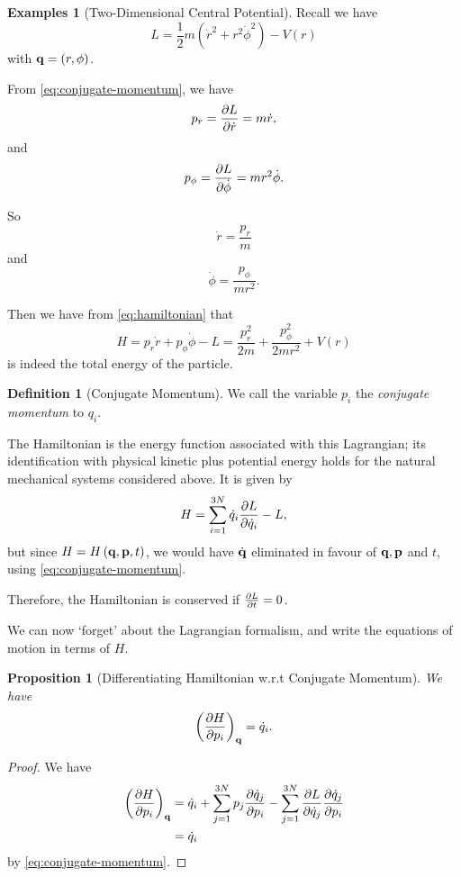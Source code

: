 \documentclass[11pt]{article}
\numberwithin{equation}{section}
\newtheorem{proposition}[theorem]{Proposition}
\theoremstyle{definition}
\newtheorem{definition}[theorem]{Definition}
\newtheorem{examples}[theorem]{Examples}
\theoremstyle{remark}
\newcommand{\pqty}[1]{\left(#1\right)}
\begin{document}
\begin{examples}[Two-Dimensional Central Potential]\label{variation-unit-0066}
    Recall we have
    \[
        L = \frac{1}{2} m \pqty{\dot{r}^2 + r^2 \dot{\phi}^2} - V\pqty{r}
    \]
    with \(\vb{q} = \pqty{r, \phi}\).

    From \autoref{eq:conjugate-momentum}, we have
    \[
        p_r = \pdv{L}{\dot{r}} = m \dot{r},
    \]
    and
    \[
        p_{\phi} = \pdv{L}{\dot{\phi}} = m r^2 \dot{\phi}.
    \]

    So
    \[
        \dot{r} = \frac{p_r}{m}
    \]
    and
    \[
        \dot{\phi} = \frac{p_\phi}{m r^2}.
    \]

    Then we have from \autoref{eq:hamiltonian} that
    \[
        H = p_r \dot{r} + p_\phi \dot{\phi} - L = \frac{p_r^2}{2m} + \frac{p_\phi^2}{2 m r^2} + V\pqty{r}
    \]
    is indeed the total energy of the particle.
\end{examples}

\begin{definition}[Conjugate Momentum]\label{variation-unit-0067}
    We call the variable \(p_i\) the \emph{conjugate momentum} to \(q_i\).
\end{definition}

The Hamiltonian is the energy function associated with this Lagrangian; its identification with physical kinetic plus potential energy holds for the natural mechanical systems considered above. It is given by
\[
    H = \sum_{i = 1}^{3N} \dot{q}_i \pdv{L}{\dot{q}_i} - L,
\]
but since \(H = H\pqty{\vb{q}, \vb{p}, t}\), we would have \(\dot{\vb{q}}\) eliminated in favour of \(\vb{q}, \vb{p}\) and \(t\), using \autoref{eq:conjugate-momentum}.

Therefore, the Hamiltonian is conserved if \(\pdv*{L}{t} = 0\).

We can now `forget' about the Lagrangian formalism, and write the equations of motion in terms of \(H\).

\begin{proposition}[Differentiating Hamiltonian w.r.t Conjugate Momentum]\label{variation-unit-0068}
    \label{prop:hamiltonian-diff-conjugate-momentum}%
    We have
    \[
        \pqty{\pdv{H}{p_i}}_{\vb{q}} = \dot{q}_i.
    \]
\end{proposition}

\begin{proof}
    We have
    \begin{align*}
        \pqty{\pdv{H}{p_i}}_{\vb{q}} &= \dot{q}_i + \sum_{j = 1}^{3N} p_j \pdv{\dot{q}_j}{p_i} - \sum_{j = 1}^{3N} \pdv{L}{\dot{q}_j} \pdv{\dot{q}_j}{p_i} \\
        &= \dot{q}_i
    \end{align*}
    by \autoref{eq:conjugate-momentum}.
\end{proof}
\end{document}
